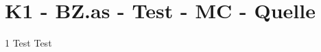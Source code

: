\section{K1 - BZ.as - Test - MC - Quelle}

\begin{langesbeispiel} \item[1] %
Test Test
\end{langesbeispiel}